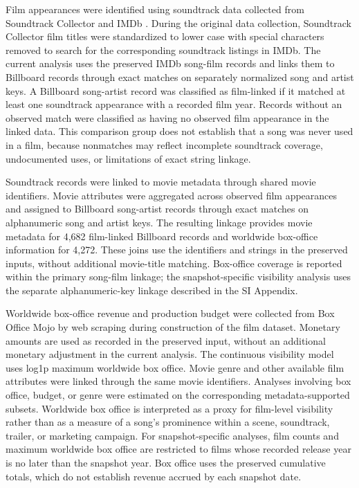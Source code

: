 \documentclass[10pt]{article}
\begin{document}
Film appearances were identified using soundtrack data collected from Soundtrack Collector and IMDb \citep{utreras2024}. During the original data collection, Soundtrack Collector film titles were standardized to lower case with special characters removed to search for the corresponding soundtrack listings in IMDb. The current analysis uses the preserved IMDb song-film records and links them to Billboard records through exact matches on separately normalized song and artist keys. A Billboard song-artist record was classified as film-linked if it matched at least one soundtrack appearance with a recorded film year. Records without an observed match were classified as having no observed film appearance in the linked data. This comparison group does not establish that a song was never used in a film, because nonmatches may reflect incomplete soundtrack coverage, undocumented uses, or limitations of exact string linkage.

Soundtrack records were linked to movie metadata through shared movie identifiers. Movie attributes were aggregated across observed film appearances and assigned to Billboard song-artist records through exact matches on alphanumeric song and artist keys. The resulting linkage provides movie metadata for 4,682 film-linked Billboard records and worldwide box-office information for 4,272. These joins use the identifiers and strings in the preserved inputs, without additional movie-title matching. Box-office coverage is reported within the primary song-film linkage; the snapshot-specific visibility analysis uses the separate alphanumeric-key linkage described in the SI Appendix.

Worldwide box-office revenue and production budget were collected from Box Office Mojo by web scraping during construction of the film dataset. Monetary amounts are used as recorded in the preserved input, without an additional monetary adjustment in the current analysis. The continuous visibility model uses log1p maximum worldwide box office. Movie genre and other available film attributes were linked through the same movie identifiers. Analyses involving box office, budget, or genre were estimated on the corresponding metadata-supported subsets. Worldwide box office is interpreted as a proxy for film-level visibility rather than as a measure of a song's prominence within a scene, soundtrack, trailer, or marketing campaign. For snapshot-specific analyses, film counts and maximum worldwide box office are restricted to films whose recorded release year is no later than the snapshot year. Box office uses the preserved cumulative totals, which do not establish revenue accrued by each snapshot date.
\end{document}

